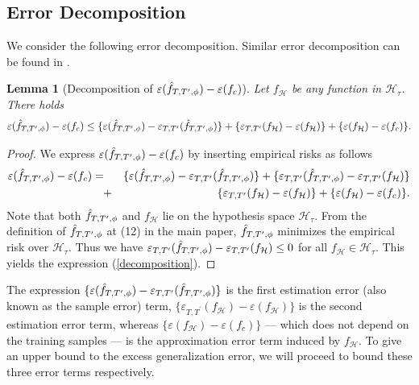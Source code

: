 \documentclass{article}
\newtheorem{lemma}{Lemma}
\begin{document}
\subsection{Error Decomposition}\label{subsec:decomposition}
We consider the following error decomposition. Similar error decomposition can be found in \citep{zhou2023classification}.
\begin{lemma}[Decomposition of $\varepsilon(\Hat{f}_{T, T^\prime,\phi}) - \varepsilon(f_c)$]
Let $f_\mathcal{H}$ be any function in $\mathcal{H}_\tau$. There holds 
\begin{equation} \label{decomposition}
   \varepsilon(\Hat{f}_{T, T^\prime,\phi}) - \varepsilon(f_c) \leq \{\varepsilon(\Hat{f}_{T, T^\prime,\phi})- \varepsilon_{T,T^\prime}(\Hat{f}_{T, T^\prime,\phi})\}  +  \{\varepsilon_{T,T^\prime}(f_\mathcal{H}) - \varepsilon(f_\mathcal{H})\} + \{\varepsilon(f_\mathcal{H}) - \varepsilon(f_c)\}.
\end{equation}
\end{lemma}
\begin{proof} We express $\varepsilon(\Hat{f}_{T, T^\prime,\phi}) - \varepsilon(f_c)$ by inserting empirical risks as follows
\begin{eqnarray*}
    \varepsilon(\Hat{f}_{T, T^\prime,\phi}) - \varepsilon(f_c)
    &=& \{\varepsilon(\Hat{f}_{T, T^\prime,\phi})- \varepsilon_{T,T^\prime}(\Hat{f}_{T, T^\prime,\phi})\}
    + \{\varepsilon_{T,T^\prime}(\Hat{f}_{T, T^\prime,\phi}) - \varepsilon_{T,T^\prime}(f_\mathcal{H})\} \\
    &\quad +&  \{\varepsilon_{T,T^\prime}(f_\mathcal{H}) - \varepsilon(f_\mathcal{H})\} + \{\varepsilon(f_\mathcal{H}) - \varepsilon(f_c)\}.
\end{eqnarray*}
Note that both $\Hat{f}_{T, T^\prime,\phi}$ and $f_\mathcal{H}$ lie on the hypothesis space $\mathcal{H}_\tau$. From the definition of $\Hat{f}_{T, T^\prime,\phi}$ at (12) in the main paper,
$\Hat{f}_{T, T^\prime,\phi}$ minimizes the empirical risk over $\mathcal{H}_\tau$. Thus we have $\varepsilon_{T,T^\prime}(\Hat{f}_{T, T^\prime,\phi}) - \varepsilon_{T,T^\prime}(f_\mathcal{H}) \leq 0$ for all $ f_\mathcal{H} \in \mathcal{H}_\tau$. This yields the expression (\ref{decomposition}).
\end{proof}

The expression $\{\varepsilon(\Hat{f}_{T, T^\prime,\phi})- \varepsilon_{T,T^\prime}(\Hat{f}_{T, T^\prime,\phi})\}$ is the first estimation error (also known as the sample error) term, $\{\varepsilon_{T,T^\prime}(f_\mathcal{H}) - \varepsilon(f_\mathcal{H})\}$ is the second estimation error term, whereas $\{\varepsilon(f_\mathcal{H}) - \varepsilon(f_c)\}$ --- which does not depend on the training samples --- is the approximation error term induced by $f_\mathcal{H}$. To give an upper bound to the excess generalization error, we will proceed to bound these three error terms respectively. 
\end{document}
